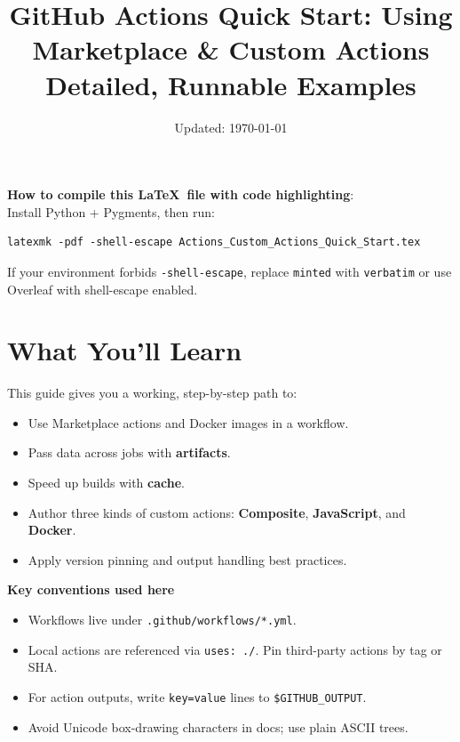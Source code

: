 \documentclass[11pt]{article}
\title{\textbf{GitHub Actions Quick Start: Using Marketplace \& Custom Actions}\\\large Detailed, Runnable Examples}
\author{}
\date{Updated: \today}
\begin{document}
\maketitle
\tableofcontents
\clearpage

\begin{tcolorbox}
\textbf{How to compile this \LaTeX\ file with code highlighting}:\\
Install Python + Pygments, then run:
\begin{verbatim}
latexmk -pdf -shell-escape Actions_Custom_Actions_Quick_Start.tex
\end{verbatim}
If your environment forbids \texttt{-shell-escape}, replace \texttt{minted} with \texttt{verbatim} or use Overleaf with shell-escape enabled.
\end{tcolorbox}

\section{What You'll Learn}
This guide gives you a working, step-by-step path to:
\begin{itemize}
  \item Use Marketplace actions and Docker images in a workflow.
  \item Pass data across jobs with \textbf{artifacts}.
  \item Speed up builds with \textbf{cache}.
  \item Author three kinds of custom actions: \textbf{Composite}, \textbf{JavaScript}, and \textbf{Docker}.
  \item Apply version pinning and output handling best practices.
\end{itemize}

\begin{tcolorbox}
\textbf{Key conventions used here}
\begin{itemize}
  \item Workflows live under \texttt{.github/workflows/*.yml}.
  \item Local actions are referenced via \texttt{uses: ./}. Pin third-party actions by tag or SHA.
  \item For action outputs, write \texttt{key=value} lines to \texttt{\$GITHUB\_OUTPUT}.
  \item Avoid Unicode box-drawing characters in docs; use plain ASCII trees.
\end{itemize}
\end{tcolorbox}
\clearpage
\end{document}
